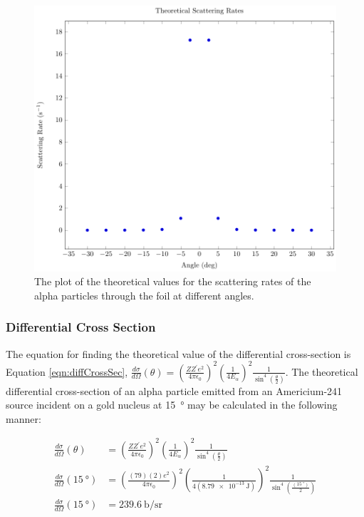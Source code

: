 \documentclass[a4paper]{article}
\begin{document}
\begin{figure}[H]
  \begin{center}
    \includegraphics[scale=0.8]{Plots/TheoreticalScatteringRates/theoScatRates.pdf}
  \end{center}
  \caption{The plot of the theoretical values for the scattering rates of the
    alpha particles through the foil at different angles.}
  \label{gph:theoScatRatesGold}
\end{figure}

\subsubsection{Differential Cross Section}

\qq The equation for finding the theoretical value of the differential
cross-section is Equation \ref{eqn:diffCrossSec},
\( \frac{d\sigma}{d\Omega} (\theta) = \left( \frac{Z Z^{\prime} e^2}{4 \pi
    \epsilon_0} \right)^2 \left( \frac{1}{4 E_{\alpha}} \right)^2
\frac{1}{\sin^4 \left( \frac{\theta}{2} \right)} \). The theoretical differential
cross-section of an alpha particle emitted from an Americium-241 source
incident on a gold nucleus at \SI{15}{\degree} may be calculated in the
following manner:

\begin{align*}
  \frac{d\sigma}{d\Omega} (\theta) &= \left( \frac{Z Z^{\prime} e^2}{4 \pi
                                     \epsilon_0} \right)^2 \left( \frac{1}{4 E_{\alpha}} \right)^2
                                     \frac{1}{\sin^4 \left( \frac{\theta}{2} \right)} \\
  \frac{d\sigma}{d\Omega} (\SI{15}{\degree}) 
                                   &= \left( \frac{(79) (2) e^2}{4 \pi \epsilon_0} \right)^2 
                                     \left( \frac{1}{4 (\SI{8.79e-13}{\joule})} \right)^2
                                     \frac{1}{\sin^4 \left( \frac{(\SI{15}{\degree})}{2} \right)} \\
  \frac{d\sigma}{d\Omega} (\SI{15}{\degree}) &=
                                               \SI{239.6}{\barn\per\steradian}
  \\
\end{align*}
\end{document}

